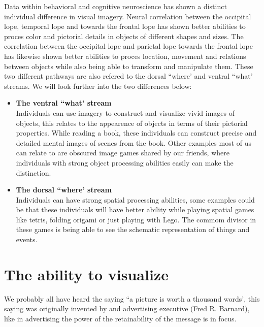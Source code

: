 Data within behavioral and cognitive neuroscience has shown a distinct individual difference in visual imagery. Neural correlation between the occipital lope, temporal lope and towards the frontal lope has shown better abilities to proces color and pictorial details in objects of different shapes and sizes. The correlation between the occipital lope and parietal lope towards the frontal lope has likewise shown better abilities to proces location, movement and relations between objects while also being able to transform and manipulate them.
These two different pathways are also refered to the dorsal ``where' and ventral ``what' streams\cite{harvard2022}.
We will look further into the two differences below:
\begin{itemize}
  \item \textbf{The ventral ``what' stream} \\
   Individuals can use imagery to construct and visualize vivid images of objects, this relates to the appearence of objects in terms of their pictorial properties. While reading a book, these individuals can construct precise and detailed mental images of scenes from the book. Other examples most of us can relate to are obscured image games shared by our friends, where individuals with strong object processing abilities easily can make the distinction\cite{harvard2022}.
  \item \textbf{The dorsal ``where' stream} \\
   Individuals can have strong spatial processing abilities, some examples could be that these individuals will have better ability while playing spatial games like tetris, folding origami or just playing with Lego. The commom divisor in these games is being able to see the schematic representation of things and events\cite{harvard2022}.
\end{itemize}

\section{The ability to visualize}\label{ch:theAbilityToVisualize}
We probably all have heard the saying ``a picture is worth a thousand words', this saying was originally invented by and advertising executive (Fred R. Barnard)\cite{phrases2022}, like in advertising the power of the retainability of the message is in focus. 


